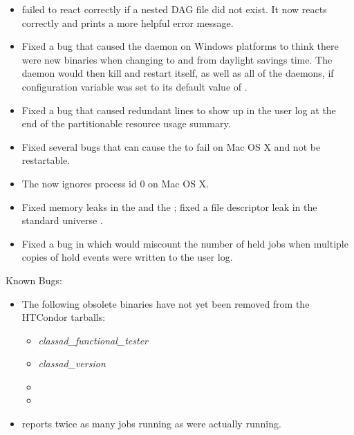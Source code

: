 \begin{itemize}
\item {} failed to react correctly if a nested DAG file
did not exist. It now reacts correctly and prints a more
helpful error message.

\item Fixed a bug that caused the  daemon on Windows platforms
to think there were new binaries
when changing to and from daylight savings time.
The  daemon would then kill and restart itself,
as well as all of the daemons,
if configuration variable  was set
to its default value of .

\item Fixed a bug that caused redundant lines to show up in the user log
at the end of the partitionable resource usage summary.

\item Fixed several bugs that can cause the  to fail on Mac OS X
and not be restartable.

\item The  now ignores process id 0 on Mac OS X.

\item Fixed memory leaks in the  and the ;
fixed a file descriptor leak in the standard universe .

\item Fixed a bug in which  would miscount the number
of held jobs when
multiple copies of hold events were written to the user log.

\end{itemize}

\noindent Known Bugs:

\begin{itemize}

\item The following obsolete binaries have not yet been removed from
the HTCondor tarballs:  
  \begin{itemize}
  \item \emph{classad\_functional\_tester}
  \item \emph{classad\_version}
  \item {}
  \item {}
  \end{itemize}

\item {}  reports twice
as many jobs running as were actually running.

\end{itemize}

